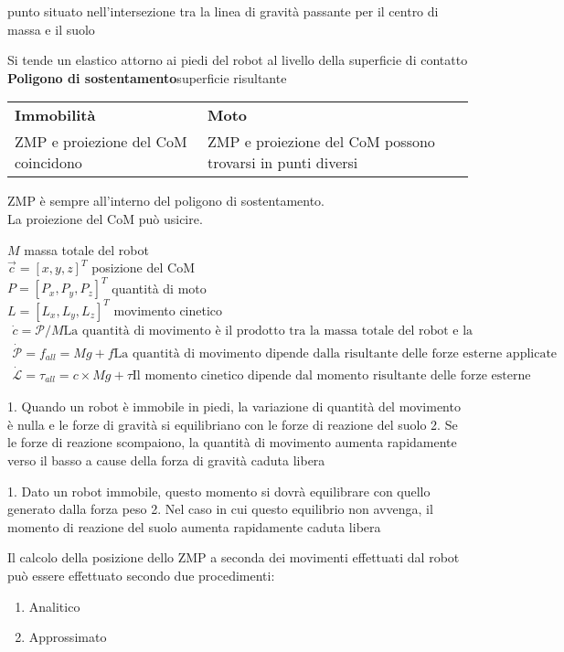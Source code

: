 \documentclass[a4paper,portrait,12pt]{article}
\theoremstyle{definition}
\begin{document}
punto situato nell’intersezione tra la linea di
gravità passante per il centro di massa e il
suolo

Si tende un elastico attorno ai piedi del robot al livello della superficie di contatto
\textbf{Poligono di sostentamento}superficie risultante

\begin{table}
\centering
\begin{tabular}{p{.5\linewidth}p{.5\linewidth}}
\textbf{Immobilità} & \textbf{Moto}\\
ZMP e proiezione del CoM coincidono & ZMP e proiezione del CoM possono trovarsi in punti diversi
\end{tabular}
\end{table}

ZMP è sempre all'interno del poligono di sostentamento.\\
La proiezione del CoM può usicire.

$M$ massa totale del robot\\
$\vec{c} = [x,y,z]^T$ posizione del CoM\\
$P = [P_x, P_y, P_z]^T$ quantità di moto\\
$L = [L_x, L_y, L_z]^T$ movimento cinetico\\

\begin{align*}
\dot{c} = \mathcal{P} / M \text{La quantità di movimento è il prodotto tra la massa totale del robot e la velocità del suo CoM}\\
\dot{\mathcal{P}} = f_{all} = Mg + f\text{La quantità di movimento dipende dalla risultante delle forze esterne applicate al robot.}\\
\dot{\mathcal{L}} = \tau_{all} = c \times Mg + \tau \text{Il momento cinetico dipende dal momento risultante delle forze esterne}
\end{align*}

1. Quando un robot è immobile in piedi, la variazione di quantità del movimento è 
nulla e le forze di gravità si equilibriano con le forze di reazione del suolo
2. Se le forze di reazione scompaiono, la quantità di movimento aumenta 
rapidamente verso il basso a cause della forza di gravità caduta libera

1. Dato un robot immobile, questo momento si dovrà equilibrare con quello 
generato dalla forza peso
2. Nel caso in cui questo equilibrio non avvenga, il momento di reazione del suolo 
aumenta rapidamente caduta libera

Il calcolo della posizione dello ZMP a seconda dei
movimenti effettuati dal robot può essere effettuato
secondo due procedimenti:
\begin{enumerate}
\item Analitico
\item Approssimato
\end{enumerate}
\end{document}
